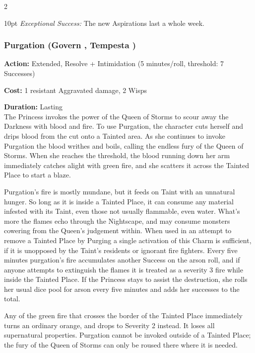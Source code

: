 \begin{multicols}{2}
\begin{myindentpar}{10pt}
\emph{Exceptional Success:}	The new Aspirations last a whole week.

\end{myindentpar}

\subsubsection*{Purgation (Govern \textbullet\textbullet\textbullet, Tempesta \textbullet\textbullet\textbullet\textbullet)}

\noindent \textbf{Action:} Extended, Resolve + Intimidation (5 minutes/roll, threshold: 7 Successes)

\noindent \textbf{Cost:} 1 resistant Aggravated damage, 2 Wisps

\noindent \textbf{Duration:} Lasting \\

\noindent The Princess invokes the power of the Queen of Storms to scour away the Darkness with blood and fire. To use Purgation, the character cuts herself and drips blood from the cut onto a Tainted area. As she continues to invoke Purgation the blood writhes and boils, calling the endless fury of the Queen of Storms. When she reaches the threshold, the blood running down her arm immediately catches alight with green fire, and she scatters it across the Tainted Place to start a blaze.

Purgation’s fire is mostly mundane, but it feeds on Taint with an unnatural hunger. So long as it is inside a Tainted Place, it can consume any material infested with its Taint, even those not usually flammable, even water. What's more the flames echo through the Nightscape, and may consume monsters cowering from the Queen's judgement within. When used in an attempt to remove a Tainted Place by Purging a single activation of this Charm is sufficient, if it is unopposed by the Taint's residents or ignorant fire fighters. Every five minutes purgation's fire accumulates another Success on the arson roll, and if anyone attempts to extinguish the flames it is treated as a severity 3 fire while inside the Tainted Place. If the Princess stays to assist the destruction, she rolls her usual dice pool for arson every five minutes and adds her successes to the total. 

Any of the green fire that crosses the border of the Tainted Place immediately turns an ordinary orange, and drops to Severity 2 instead. It loses all supernatural properties. Purgation cannot be invoked outside of a Tainted Place; the fury of the Queen of Storms can only be roused there where it is needed.




\end{multicols}
